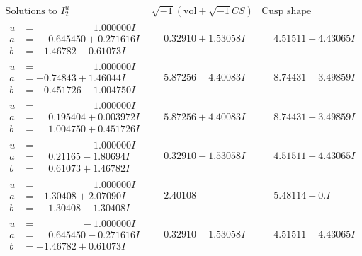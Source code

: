 \documentclass[1p]{elsarticle_modified}
\theoremstyle{definition}
\newcommand{\I}{\sqrt{-1}}
\begin{document}
$$\begin{array}{c|c|c}  
\text{Solutions to }I^u_{2}& \I (\text{vol} + \sqrt{-1}CS) & \text{Cusp shape}\\
 \hline 
\begin{aligned}
u &= \phantom{-0.000000 -}1.000000 I \\
a &= \phantom{-}0.645450 + 0.271616 I \\
b &= -1.46782 - 0.61073 I\end{aligned}
 & \phantom{-}0.32910 + 1.53058 I & \phantom{-}4.51511 - 4.43065 I \\ \hline\begin{aligned}
u &= \phantom{-0.000000 -}1.000000 I \\
a &= -0.74843 + 1.46044 I \\
b &= -0.451726 - 1.004750 I\end{aligned}
 & \phantom{-}5.87256 - 4.40083 I & \phantom{-}8.74431 + 3.49859 I \\ \hline\begin{aligned}
u &= \phantom{-0.000000 -}1.000000 I \\
a &= \phantom{-}0.195404 + 0.003972 I \\
b &= \phantom{-}1.004750 + 0.451726 I\end{aligned}
 & \phantom{-}5.87256 + 4.40083 I & \phantom{-}8.74431 - 3.49859 I \\ \hline\begin{aligned}
u &= \phantom{-0.000000 -}1.000000 I \\
a &= \phantom{-}0.21165 - 1.80694 I \\
b &= \phantom{-}0.61073 + 1.46782 I\end{aligned}
 & \phantom{-}0.32910 - 1.53058 I & \phantom{-}4.51511 + 4.43065 I \\ \hline\begin{aligned}
u &= \phantom{-0.000000 -}1.000000 I \\
a &= -1.30408 + 2.07090 I \\
b &= \phantom{-}1.30408 - 1.30408 I\end{aligned}
 & \phantom{-}2.40108\phantom{ +0.000000I} & \phantom{-}5.48114 + 0. I\phantom{ +0.000000I} \\ \hline\begin{aligned}
u &= \phantom{-0.000000 } -1.000000 I \\
a &= \phantom{-}0.645450 - 0.271616 I \\
b &= -1.46782 + 0.61073 I\end{aligned}
 & \phantom{-}0.32910 - 1.53058 I & \phantom{-}4.51511 + 4.43065 I \\ \hline\begin{aligned}

\end{aligned}
\end{array}$$
\end{document}
